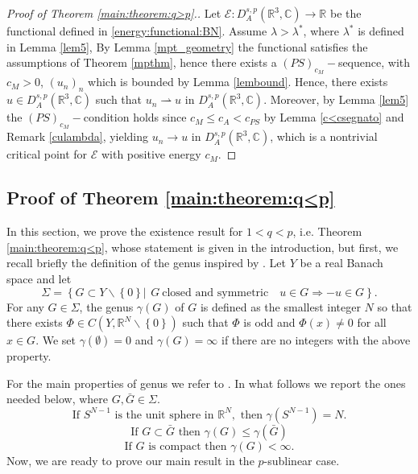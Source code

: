 \documentclass[leqno,11pt]{amsart}
\newcommand{\R}{\mathbb R}
\newcommand{\C}{\mathbb C}
\newcommand{\cE}{{\mathcal E}}
\numberwithin{equation}{section}
\newcommand{\weakto}{\rightharpoonup}
\begin{document}
\begin{proof}[Proof of Theorem \ref{main:theorem:q>p}.]
Let $\cE:D^{s,p}_A(\R^3,\C) \to \R$ be the functional defined in \eqref{energy:functional:BN}. Assume  $\lambda>\lambda^*$, where $\lambda^*$ is defined in Lemma \ref{lem5},
By Lemma \ref{mpt_geometry} the functional satisfies the assumptions of Theorem \ref{mpthm}, hence there exists a $(PS)_{c_M}-$sequence, with $c_M>0$, $(u_n)_n$ which is bounded by Lemma \ref{lembound}. Hence, there exists $u \in D^{s,p}_A(\R^3,\C)$ such that $u_n \weakto u$ in $D^{s,p}_A(\R^3,\C)$.
Moreover, by Lemma \ref{lem5} the $(PS)_{c_M}-$condition holds since $c_M \le c_A< c_{PS}$ by Lemma \ref{c<csegnato} and Remark \ref{culambda}, yielding $u_n \to u$ in $D^{s,p}_A(\R^3,\C)$, which is a nontrivial critical point for $\cE$ with positive energy $c_M$.
\end{proof}

\subsection{Proof of Theorem \ref{main:theorem:q<p}}


In this section, we prove the existence result for $1<q<p$, i.e. Theorem \ref{main:theorem:q<p}, whose statement is given in the introduction, but first,
we recall briefly the definition of the genus inspired by \cite{GP87, struwe}. Let $Y$ be a real Banach space and let
$$
    \Sigma=\left\{ G\subset Y \backslash\left\{0\right\} | \,\ G \ \text{closed and symmetric} \quad u\in G\Rightarrow -u\in G\right\}.
$$
For any $G\in\Sigma$, the genus $\gamma\left( G\right)$ of $G$ is defined as the smallest integer $N$ so that there exists
$\Phi\in C\left( Y,\mathbb{R}^N\backslash\left\{0\right\}\right)$ such that $\Phi$ is odd and $\Phi\left(x\right)\ne 0$ for all
$x\in G$. We set $\gamma\left(\emptyset \right)=0$ and $\gamma\left(G\right)=\infty$ if there are no integers with the above property.

For the main properties of genus we refer to \cite[Proposition 1]{BBF}. In what follows we report the ones needed below, where $G,\bar G\in\Sigma$.
\begin{equation}\label{genussphere}
    \text{If } S^{N-1} \text{ is the unit sphere in } \R^N, \text{ then } \gamma(S^{N-1})=N.
\end{equation}
\begin{equation}\label{genussubset}
    \text{If $G\subset \bar G$ then $\gamma(G)\le\gamma(\bar G)$}
\end{equation}
\begin{equation}\label{genuscompact}
    \text{If $G$ is compact then $\gamma(G)<\infty$.}
\end{equation}
Now, we are ready to prove our main result in the $p$-sublinear case.
\end{document}
